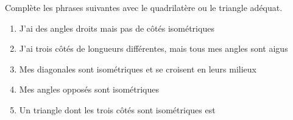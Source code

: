 %
%
	Complète les phrases suivantes avec le quadrilatère ou le triangle adéquat.
	\begin{enumerate}[itemsep=1.5cm]
		\item J'ai des angles droits mais pas de côtés isométriques
		\item J'ai trois côtés de longueurs différentes, mais tous mes angles sont aigus
		\item Mes diagonales sont isométriques et se croisent en leurs milieux
		\item Mes angles opposés sont isométriques
		\item Un triangle dont les trois côtés sont isométriques est
	\end{enumerate}
